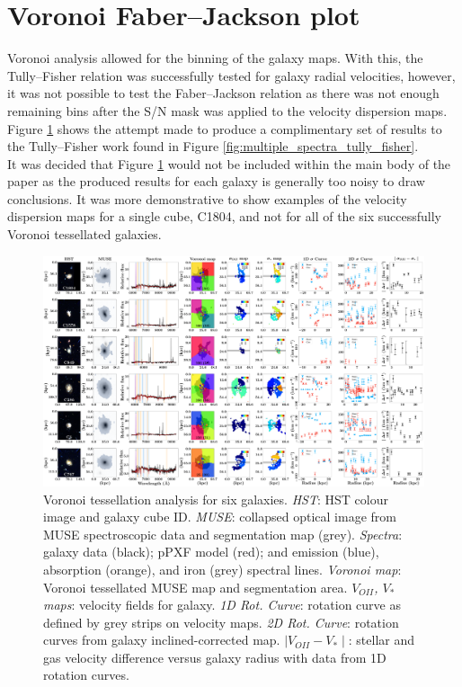 \documentclass[12pt, twocolumn, nofootinbib]{revtex4-1}    %
\begin{document}
\vspace{2ex} %
\section{Voronoi Faber--Jackson plot} \label{appendix:voronoi_faber_jackson}
\noindent
Voronoi analysis allowed for the binning of the galaxy maps. With this, the Tully--Fisher relation was successfully tested for galaxy radial velocities, however, it was not possible to test the Faber--Jackson relation as there was not enough remaining bins after the S/N mask was applied to the velocity dispersion maps. Figure \ref{fig:multiple_spectra_faber_jackson} shows the attempt made to produce a complimentary set of results to the Tully--Fisher work found in Figure \ref{fig:multiple_spectra_tully_fisher}. \\

It was decided that Figure \ref{fig:multiple_spectra_faber_jackson} would not be included within the main body of the paper as the produced results for each galaxy is generally too noisy to draw conclusions. It was more demonstrative to show examples of the velocity dispersion maps for a single cube, C1804, and not for all of the six successfully Voronoi tessellated galaxies. 

\begin{figure}
\includegraphics[width=1.0\textheight,height=0.6\textwidth]{data/spectra_complete_velocity_dispersions.pdf}
\caption[Faber--Jackson]{Voronoi tessellation analysis for six galaxies. \textit{HST}: HST colour image and galaxy cube ID. \textit{MUSE}: collapsed optical image from MUSE spectroscopic data and segmentation map (grey). \textit{Spectra}: galaxy data (black); pPXF model (red); and emission (blue), absorption (orange), and iron (grey) spectral lines. \textit{Voronoi map}: Voronoi tessellated MUSE map and segmentation area. \textit{$V_{OII}$, $V_{*}$ maps}: velocity fields for galaxy. \textit{1D Rot. Curve}: rotation curve as defined by grey strips on velocity maps. \textit{2D Rot. Curve}: rotation curves from galaxy inclined-corrected map. \textit{$\mid V_{OII}-V_* \mid$}: stellar and gas velocity difference versus galaxy radius with data from 1D rotation curves.}
\label{fig:multiple_spectra_faber_jackson}
\end{figure}
\end{document}
